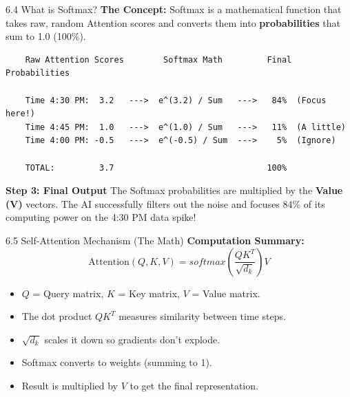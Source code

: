 \documentclass[aspectratio=169]{beamer}
\begin{document}
\begin{frame}[fragile]{6.4 What is Softmax?}
    \small
    \textbf{The Concept:} 
    Softmax is a mathematical function that takes raw, random Attention scores and converts them into \textbf{probabilities} that sum to 1.0 (100\%).
    
    \begin{verbatim}
    Raw Attention Scores        Softmax Math         Final Probabilities
    
    Time 4:30 PM:  3.2   --->  e^(3.2) / Sum   --->   84%  (Focus here!)
    Time 4:45 PM:  1.0   --->  e^(1.0) / Sum   --->   11%  (A little)
    Time 4:00 PM: -0.5   --->  e^(-0.5) / Sum  --->    5%  (Ignore)
    
    TOTAL:         3.7                               100% 
    \end{verbatim}

    \textbf{Step 3: Final Output}
    The Softmax probabilities are multiplied by the \textbf{Value (V)} vectors. The AI successfully filters out the noise and focuses 84\% of its computing power on the 4:30 PM data spike!
\end{frame}

\begin{frame}{6.5 Self-Attention Mechanism (The Math)}
    \textbf{Computation Summary:}
    \[
    \text{Attention}(Q,K,V) = softmax\left(\frac{QK^T}{\sqrt{d_k}}\right)V
    \]
    \begin{itemize}
        \item $Q$ = Query matrix, $K$ = Key matrix, $V$ = Value matrix.
        \item The dot product $QK^T$ measures similarity between time steps.
        \item $\sqrt{d_k}$ scales it down so gradients don't explode.
        \item Softmax converts to weights (summing to 1).
        \item Result is multiplied by $V$ to get the final representation.
    \end{itemize}
\end{frame}

\end{document}
